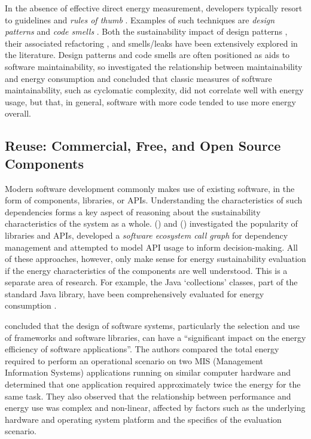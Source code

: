 In the absence of effective direct energy measurement, developers typically resort to guidelines and \emph{rules of thumb} \citep{Aggarwal2015}. Examples of such techniques are \emph{design patterns} \citep{Gamma1994} and \emph{code smells} \citep{Fowler1999}. Both the sustainability impact of design patterns \citep{Sahin2012} \citep{Noureddine2015a} \citep{Litke2005}, their associated refactoring \citep{daSilva2010} \citep{Sahin2014}, and smells/leaks \citep{Gottschalk2012} \citep{Palomba2019} \citep{Pereira2020} \citep{Vetro2013} have been extensively explored in the literature. Design patterns and code smells are often positioned as aids to software maintainability, so \citet{Mancebo2021} investigated the relationship between maintainability and energy consumption and concluded that classic measures of software maintainability, such as cyclomatic complexity, did not correlate well with energy usage, but that, in general, software with more code tended to use more energy overall.

\subsection{Reuse: Commercial, Free, and Open Source Components}
\label{literature:components}

Modern software development commonly makes use of existing software, in the form of components, libraries, or APIs. Understanding the characteristics of such dependencies forms a key aspect of reasoning about the sustainability characteristics of the system as a whole. \citeauthor{Mileva2010} (\citeyear{Mileva2009}) and (\citeyear{Mileva2010}) investigated the popularity of libraries and APIs, \citet{Hejderup2018} developed a \emph{software ecosystem call graph} for dependency management and \citet{Bauer2012a} attempted to model API usage to inform decision-making. All of these approaches, however, only make sense for energy sustainability evaluation if the energy characteristics of the components are well understood. This is a separate area of research. For example, the Java `collections' classes, part of the standard Java library, have been comprehensively evaluated for energy consumption \citep{Hasan2016} \citep{Pereira2016} \citep{Pinto2016}.

\citet{Capra2012} concluded that the design of software systems, particularly the selection and use of frameworks and software libraries, can have a \enquote{significant impact on the energy efficiency of software applications}. The authors compared the total energy required to perform an operational scenario on two MIS (Management Information Systems) applications running on similar computer hardware and determined that one application required approximately twice the energy for the same task. They also observed that the relationship between performance and energy use was complex and non-linear, affected by factors such as the underlying hardware and operating system platform and the specifics of the evaluation scenario.


